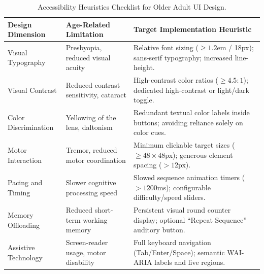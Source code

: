 \documentclass{cleiej}
\begin{document}
\begin{table}[ht]
\centering
\caption{Accessibility Heuristics Checklist for Older Adult UI Design.}
\label{tab:appendix_heuristics}
\small
\begin{tabularx}{\textwidth}{p{3.5cm} p{4.0cm} X}
\toprule
\textbf{Design Dimension} & \textbf{Age-Related Limitation} & \textbf{Target Implementation Heuristic} \\
\midrule
Visual Typography & Presbyopia, reduced visual acuity & Relative font sizing ($\ge 1.2$em / 18px); sans-serif typography; increased line-height. \\
Visual Contrast   & Reduced contrast sensitivity, cataract & High-contrast color ratios ($\ge 4.5:1$); dedicated high-contrast or light/dark toggle. \\
Color Discrimination & Yellowing of the lens, daltonism & Redundant textual color labels inside buttons; avoiding reliance solely on color cues. \\
Motor Interaction & Tremor, reduced motor coordination & Minimum clickable target sizes ($\ge 48 \times 48$px); generous element spacing ($>12$px). \\
Pacing and Timing & Slower cognitive processing speed & Slowed sequence animation timers ($>1200$ms); configurable difficulty/speed sliders. \\
Memory Offloading & Reduced short-term working memory & Persistent visual round counter display; optional ``Repeat Sequence'' auditory button. \\
Assistive Technology & Screen-reader usage, motor disability & Full keyboard navigation (Tab/Enter/Space); semantic WAI-ARIA labels and live regions. \\
\bottomrule
\end{tabularx}
\end{table}



\end{document}
